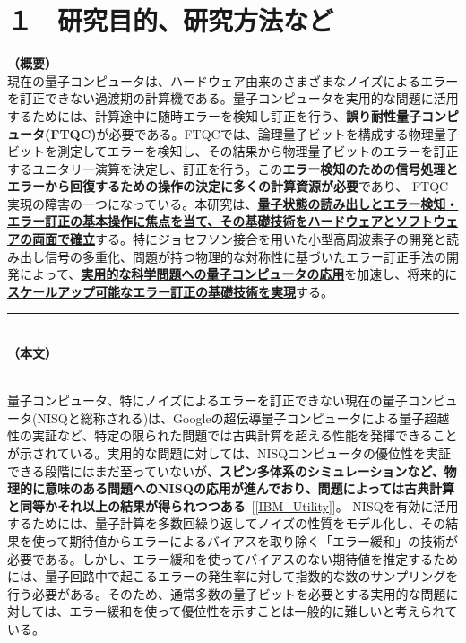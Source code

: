 \documentclass[11pt,a4j,dvipdfmx]{jarticle} 					%
\newcommand{\研究課題名}{誤り耐性量子コンピュータに向けた誤り訂正技術の開発(仮)}
\newcommand{\研究機関名}{東京大学}
\newcommand{\研究代表者氏名}{寺師弘二}
\newcommand{\研究期間の最終元号年度}{10}  %
\newcommand{\mybf}[1]{{\bfseries\sffamily#1}}
\begin{document}

\section{１　研究目的、研究方法など}

\noindent
\textbf{（概要）}\\
現在の量子コンピュータは、ハードウェア由来のさまざまなノイズによるエラーを訂正できない過渡期の計算機である。量子コンピュータを実用的な問題に活用するためには、計算途中に随時エラーを検知し訂正を行う、\mybf{誤り耐性量子コンピュータ(FTQC)}が必要である。FTQCでは、論理量子ビットを構成する物理量子ビットを測定してエラーを検知し、その結果から物理量子ビットのエラーを訂正するユニタリー演算を決定し、訂正を行う。この\mybf{エラー検知のための信号処理とエラーから回復するための操作の決定に多くの計算資源が必要}であり、 FTQC実現の障害の一つになっている。本研究は、\mybf{\ul{量子状態の読み出しとエラー検知・エラー訂正の基本操作に焦点を当て、その基礎技術をハードウェアとソフトウェアの両面で確立}}する。特にジョセフソン接合を用いた小型高周波素子の開発と読み出し信号の多重化、問題が持つ物理的な対称性に基づいたエラー訂正手法の開発によって、\mybf{\ul{実用的な科学問題への量子コンピュータの応用}}を加速し、将来的に\mybf{\ul{スケールアップ可能なエラー訂正の基礎技術を実現}}する。

\noindent
\rule{\linewidth}{1pt}\\
\noindent
\textbf{（本文）}

\\
量子コンピュータ、特にノイズによるエラーを訂正できない現在の量子コンピュータ(NISQと総称される)は、Googleの超伝導量子コンピュータによる量子超越性の実証など、特定の限られた問題では古典計算を超える性能を発揮できることが示されている。実用的な問題に対しては、NISQコンピュータの優位性を実証できる段階にはまだ至っていないが、\mybf{スピン多体系のシミュレーションなど、物理的に意味のある問題へのNISQの応用が進んでおり、問題によっては古典計算と同等かそれ以上の結果が得られつつある}~[\ref{IBM_Utility}]。
NISQを有効に活用するためには、量子計算を多数回繰り返してノイズの性質をモデル化し、その結果を使って期待値からエラーによるバイアスを取り除く「エラー緩和」の技術が必要である。しかし、エラー緩和を使ってバイアスのない期待値を推定するためには、量子回路中で起こるエラーの発生率に対して指数的な数のサンプリングを行う必要がある。そのため、通常多数の量子ビットを必要とする実用的な問題に対しては、エラー緩和を使って優位性を示すことは一般的に難しいと考えられている。
\end{document}
